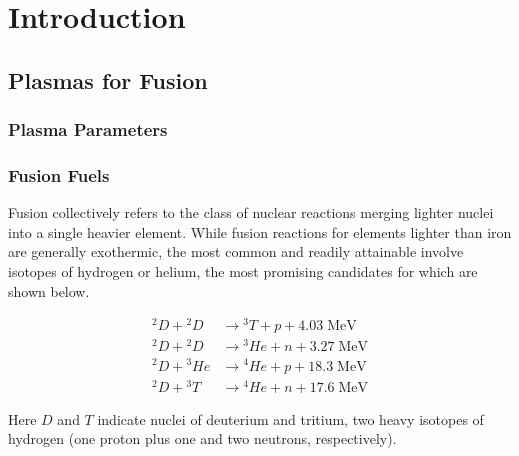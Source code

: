 \chapter{Introduction}\label{ch:Introduction}


\section{Plasmas for Fusion}\label{sec:intro_plasmas}

\subsection{Plasma Parameters}\label{subsec:intro_params}

\subsection{Fusion Fuels}\label{subsec:intro_fuels}


Fusion collectively refers to the class of nuclear reactions merging lighter nuclei into a single heavier element.  While fusion reactions for elements lighter than iron are generally exothermic, the most common and readily attainable involve isotopes of hydrogen or helium, the most promising candidates for which are shown below.

\begin{align}
 {}^2\si{D} + {}^2\si{D} &\rightarrow {}^3\si{T} + \si{p} + 4.03 \;\si{\mega\electronvolt}\label{eq:dd1}\\
 {}^2\si{D} + {}^2\si{D} &\rightarrow {}^{3}\si{He} + \si{n} + 3.27 \;\si{\mega\electronvolt}\label{eq:dd2}\\
 {}^2\si{D} + {}^3\si{He} &\rightarrow {}^4\si{He} + \si{p} + 18.3 \;\si{\mega\electronvolt}\label{eq:dhe3}\\
  {}^2\si{D} + {}^3\si{T} &\rightarrow {}^4\si{He} + \si{n} + 17.6 \;\si{\mega\electronvolt}\label{eq:dt}
\end{align}

\noindent Here $\si{D}$ and $\si{T}$ indicate nuclei of deuterium and tritium, two heavy isotopes of hydrogen (one proton plus one and two neutrons, respectively).

